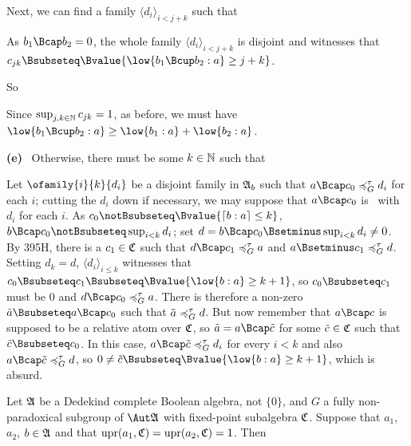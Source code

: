 {

\noindent Next, we can find a family $\langle d_i\rangle_{i<j+k}$ such
that



\noindent As $b_1\Bcap b_2=0$, the whole family
$\langle d_i\rangle_{i<j+k}$ is disjoint and witnesses that
$c_{jk}\Bsubseteq\Bvalue{\low{b_1\Bcup b_2:a}\ge j+k}$.\ \Qed

So


\noindent Since $\sup_{j,k\in\Bbb N}c_{jk}=1$, as before, we must have
$\low{b_1\Bcup b_2:a}\ge\low{b_1:a}+\low{b_2:a}$.

\medskip

{\bf (e)} \Quer\ Otherwise, there must be some $k\in\Bbb N$ such that


\noindent Let $\ofamily{i}{k}{d_i}$ be a disjoint family in $\frak A_b$
such that $a\Bcap c_0\ptG d_i$ for each $i$;  cutting the $d_i$ down if
necessary, we may suppose that $a\Bcap c_0$ is \Gte\ with $d_i$ for each
$i$.   As $c_0\notBsubseteq\Bvalue{\high{b:a}\le k}$,
$b\Bcap c_0\notBsubseteq\sup_{i<k}d_i$;  set
$d=b\Bcap c_0\Bsetminus\sup_{i<k}d_i\ne 0$.
By 395H, there is a $c_1\in\frak C$ such that $d\Bcap c_1\ptG a$ and
$a\Bsetminus c_1\ptG d$.   Setting $d_k=d$, $\langle d_i\rangle_{i\le k}$
witnesses that $c_0\Bsubseteq c_1\Bsubseteq\Bvalue{\low{b:a}\ge k+1}$,
so $c_0\Bsubseteq c_1$ must be $0$ and $d\Bcap c_0\ptG a$.
There is therefore a non-zero
$\tilde a\Bsubseteq a\Bcap c_0$ such that $\tilde a\preccurlyeq^{\tau}_G d$.   But now
remember that $a\Bcap c$ is supposed to be a relative atom over
$\frak C$, so $\tilde a=a\Bcap\tilde c$ for some $\tilde c\in\frak C$
such that $\tilde c\Bsubseteq c_0$.   In this case,
$a\Bcap\tilde c\ptG d_i$ for every $i<k$ and also
$a\Bcap\tilde c\ptG d$, so
$0\ne\tilde c\Bsubseteq\Bvalue{\low{b:a}\ge k+1}$, which is
absurd.\ \Bang
}%

 Let $\frak A$ be a Dedekind complete Boolean
algebra, not $\{0\}$, and $G$ a fully non-paradoxical subgroup of
$\Aut\frak A$ with fixed-point subalgebra $\frak C$.   Suppose that
$a_1$, $a_2$, $b\in\frak A$ and that
$\mathop{\text{upr}}(a_1,\frak C)=\mathop{\text{upr}}(a_2,\frak C)=1$.   Then

